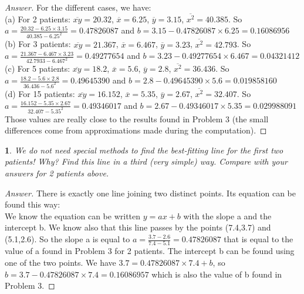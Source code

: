 \documentclass [11pt, letterpaper] {amsart}
\theoremstyle{plain}
\newtheorem{exer}{}
\theoremstyle{definition}
\begin{document}
\begin{proof}[Answer]
For the different cases, we have:\\
(a) For 2 patients:  $\overline{xy}= 20.32$, $\overline{x}= 6.25$, $\overline{y}= 3.15$, $\overline{x^{2}}= 40.385$. So $a=\frac{20.32-6.25\times 3.15}{40.385-6.25^2}=0.47826087$ and $b = 3.15 - 0.47826087\times 6.25 = 0.16086956$  \\
(b) For 3 patients:  $\overline{xy}= 21.367$, $\overline{x}= 6.467$, $\overline{y}= 3.23$, $\overline{x^{2}}= 42.793$. So $a=\frac{21.367-6.467\times 3.23}{42.7933-6.467^2}=0.49277654$ and $b = 3.23 - 0.49277654\times 6.467 = 0.04321412$  \\
(c) For 5 patients:  $\overline{xy}= 18.2$, $\overline{x}= 5.6$, $\overline{y}= 2.8$, $\overline{x^{2}}= 36.436$. So $a=\frac{18.2-5.6\times 2.8}{36.436-5.6^2}=0.49645390$ and $b = 2.8 - 0.49645390 \times 5.6 = 0.019858160$  \\
(d) For 15 patients:  $\overline{xy}= 16.152$, $\overline{x}= 5.35$, $\overline{y}= 2.67$, $\overline{x^{2}}= 32.407$. So $a=\frac{16.152-5.35\times 2.67}{32.407-5.35^2}=0.49346017$ and $b = 2.67 - 0.49346017 \times 5.35 = 0.029988091$  \\
Those values are really close to the results found in Problem 3 (the small differences come from approximations made during the computation).
\end{proof}


\vspace{0.05in}
\begin{exer} 
We do not need special methods to find the best-fitting line for the first two patients! Why? Find this line in a third (very simple) way. Compare with your answers for 2 patients above.
\end{exer}

\begin{proof}[Answer]
There is exactly one line joining two distinct points. Its equation can be found this way: \\
We know the equation can be written $y=ax+b$ with the slope a and the intercept b. We know also that this line passes by the points (7.4,3.7) and (5.1,2.6). So the slope a is equal to $a=\frac{3.7-2.6}{7.4-5.1} = 0.47826087 $ that is equal to the value of a found in Problem 3 for 2 patients. The intercept b can be found using one of the two points. We have $3.7 = 0.47826087\times7.4 + b$, so $b=3.7 - 0.47826087\times7.4=0.16086957 $ which is also the value of b found in Problem 3.

\end{proof}
\end{document}
